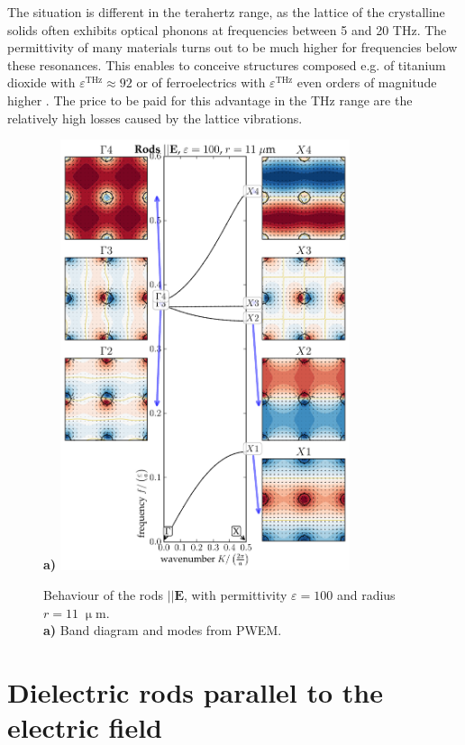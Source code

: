 {{The situation is different in the terahertz range, as the lattice of the crystalline solids often exhibits optical phonons at frequencies between 5 and 20 THz. The permittivity of many materials turns out to be much higher for frequencies below these resonances. This enables to conceive structures composed e.g. of titanium dioxide \cite{baumard1977_epsilon_TiO2} with $\varepsilon^{\text{THz}} \approx 92$ or of ferroelectrics with $\varepsilon^{\text{THz}}$ even orders of magnitude higher \cite{skoromets2011tuning}. The price to be paid for this advantage in the THz range are the relatively high losses caused by the lattice vibrations.
}

\begin{figure}[ht] \caption{Behaviour of the rods $||\mathbf E$, with permittivity $\varepsilon = 100$ and radius $r=11\;\upmu$m.\\
\textbf{a)} Band diagram and modes from PWEM. 
} \label{fg_erod_radius11} \centering 
\textbf{a)}	\includegraphics[width=8.5cm]{img/ERods_eps100_R11_PWEM.pdf}
\end{figure}

}






\section{Dielectric rods parallel to the electric field} %

